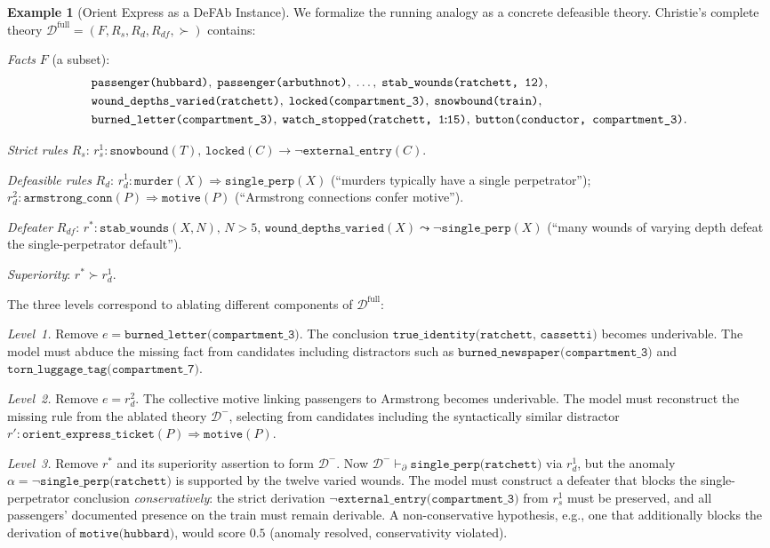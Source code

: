 \documentclass{article}
\theoremstyle{definition}
\newtheorem{example}[theorem]{Example}
\newcommand{\Dm}{\mathcal{D}^{-}}
\newcommand{\Dfull}{\mathcal{D}^{\mathrm{full}}}
\newcommand{\Rs}{R_s}
\newcommand{\Rd}{R_d}
\newcommand{\Rdf}{R_{df}}
\newcommand{\pPartial}{\vdash_{\partial}}
\newcommand{\defto}{\Rightarrow}
\newcommand{\strictto}{\rightarrow}
\newcommand{\defeatto}{\leadsto}
\begin{document}
\begin{example}[Orient Express as a DeFAb Instance]\label{ex:orient}
We formalize the running analogy as a concrete defeasible theory. Christie's complete theory $\Dfull = (F, \Rs, \Rd, \Rdf, {\succ})$ contains:

\textit{Facts} $F$ (a subset):
\begin{align*}
&\texttt{passenger(hubbard)},\; \texttt{passenger(arbuthnot)},\; \ldots,\; \texttt{stab\_wounds(ratchett, 12)}, \\
&\texttt{wound\_depths\_varied(ratchett)},\; \texttt{locked(compartment\_3)},\; \texttt{snowbound(train)}, \\
&\texttt{burned\_letter(compartment\_3)},\; \texttt{watch\_stopped(ratchett, 1\!:\!15)},\; \texttt{button(conductor, compartment\_3)}.
\end{align*}

\textit{Strict rules} $\Rs$: $r_s^1\colon \texttt{snowbound}(T),\, \texttt{locked}(C) \strictto \neg\texttt{external\_entry}(C)$.

\textit{Defeasible rules} $\Rd$: $r_d^1\colon \texttt{murder}(X) \defto \texttt{single\_perp}(X)$ (``murders typically have a single perpetrator''); $r_d^2\colon \texttt{armstrong\_conn}(P) \defto \texttt{motive}(P)$ (``Armstrong connections confer motive'').

\textit{Defeater} $\Rdf$: $r^*\colon \texttt{stab\_wounds}(X, N),\, N > 5,\, \texttt{wound\_depths\_varied}(X) \defeatto \neg\texttt{single\_perp}(X)$ (``many wounds of varying depth defeat the single-perpetrator default'').

\textit{Superiority}: $r^* \succ r_d^1$.

The three levels correspond to ablating different components of $\Dfull$:

\textit{Level~1.} Remove $e = \texttt{burned\_letter(compartment\_3)}$. The conclusion $\texttt{true\_identity(ratchett, cassetti)}$ becomes underivable. The model must abduce the missing fact from candidates including distractors such as $\texttt{burned\_newspaper(compartment\_3)}$ and $\texttt{torn\_luggage\_tag(compartment\_7)}$.

\textit{Level~2.} Remove $e = r_d^2$. The collective motive linking passengers to Armstrong becomes underivable. The model must reconstruct the missing rule from the ablated theory $\Dm$, selecting from candidates including the syntactically similar distractor $r'\colon \texttt{orient\_express\_ticket}(P) \defto \texttt{motive}(P)$.

\textit{Level~3.} Remove $r^*$ and its superiority assertion to form $\Dm$. Now $\Dm \pPartial \texttt{single\_perp(ratchett)}$ via $r_d^1$, but the anomaly $\alpha = \neg\texttt{single\_perp(ratchett)}$ is supported by the twelve varied wounds. The model must construct a defeater that blocks the single-perpetrator conclusion \emph{conservatively}: the strict derivation $\neg\texttt{external\_entry(compartment\_3)}$ from $r_s^1$ must be preserved, and all passengers' documented presence on the train must remain derivable. A non-conservative hypothesis, e.g., one that additionally blocks the derivation of $\texttt{motive(hubbard)}$, would score $0.5$ (anomaly resolved, conservativity violated).
\end{example}
\end{document}
